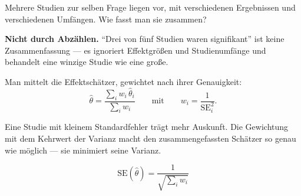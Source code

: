 \begin{merksatz}
Mehrere Studien zur selben Frage liegen vor, mit verschiedenen Ergebnissen und verschiedenen Umfängen. Wie fasst man sie zusammen?

\begin{center}
\begin{minipage}{0.9\textwidth}
\textbf{Nicht durch Abzählen.} \enquote{Drei von fünf Studien waren signifikant} ist keine Zusammenfassung --- es ignoriert Effektgrößen und Studienumfänge und behandelt eine winzige Studie wie eine große.
\end{minipage}
\end{center}

Man mittelt die Effektschätzer, gewichtet nach ihrer Genauigkeit:
\[ \hat\theta = \frac{\sum_i w_i\,\hat\theta_i}{\sum_i w_i} \qquad\text{mit}\qquad w_i = \frac{1}{\mathrm{SE}_i^2} . \]

Eine Studie mit kleinem Standardfehler trägt mehr Auskunft. Die Gewichtung mit dem Kehrwert der Varianz macht den zusammengefassten Schätzer so genau wie möglich --- sie minimiert seine Varianz.

\[ \mathrm{SE}(\hat\theta) = \frac{1}{\sqrt{\sum_i w_i}} \]
\end{merksatz}

